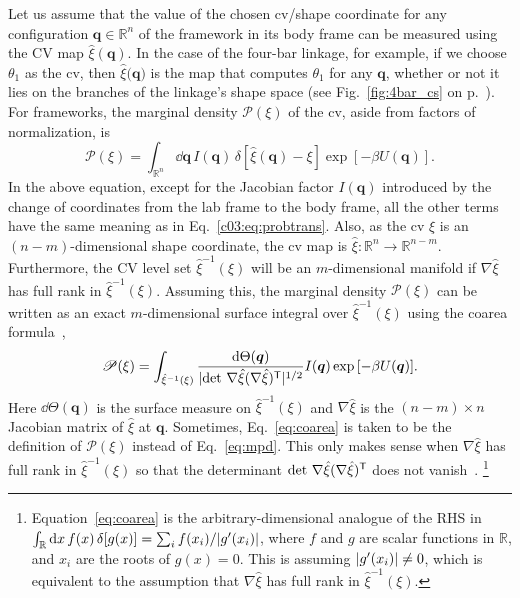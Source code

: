 Let us assume that the value of the chosen \ac{cv}/shape coordinate for any configuration $\bm{q} \in \mathbb{R}^{n}$ of the framework in its body frame can be measured using the CV map $\hat{\xi}(\bm{q})$.
In the case of the four-bar linkage, for example, if we choose $\theta_{1}$ as the \ac{cv}, then $\hat{\xi}(\bm{q)}$ is the map that computes $\theta_{1}$ for any $\bm{q}$, whether or not it lies on the branches of the linkage's shape space (see Fig.~\ref{fig:4bar_cs} on p.~\pageref{page:4bar}).
For frameworks, the marginal density $\mathscr{P}(\xi)$ of the \ac{cv}, aside from factors of normalization, is
%
\begin{equation}
  \mathscr{P}(\xi) = \int_{\mathbb{R}^{n}} \dd\bm{q}\, I(\bm{q})\, \delta\left[\hat{\xi}(\bm{q}) - \xi\right] \exp\left[-\beta U(\bm{q})\right].
  \label{eq:mpd}
\end{equation}
%
In the above equation, except for the Jacobian factor $I(\bm{q})$ introduced by the change of coordinates from the lab frame to the body frame, all the other terms have the same meaning as in Eq.~\eqref{c03:eq:probtrans}.
Also, as the \ac{cv} $\xi$ is an $(n-m)$-dimensional shape coordinate, the \ac{cv} map is $\hat{\xi}: \mathbb{R}^{n} \to \mathbb{R}^{n-m}$.
Furthermore, the CV level set $\hat{\xi}^{-1}(\xi)$ will be an $m$-dimensional manifold if $\nabla\hat{\xi}$ has full rank in $\hat{\xi}^{-1}(\xi)$.
Assuming this, the marginal density $\mathscr{P}(\xi)$ can be written as an exact $m$-dimensional surface integral over $\hat{\xi}^{-1}(\xi)$ using the coarea formula~\cite{hartmann2007,lelievre2010,hartmann2011,diaconis2013},
%
\begin{equation}
  \mathscr{P}(\xi) = \int_{\hat{\xi}^{-1}(\xi)} \frac{\mathrm{d}\Theta(\bm{q})}{\lvert\det\,\nabla\hat{\xi}(\nabla\hat{\xi})^\mathsf{T}\rvert^{1/2}} I(\bm{q}) \exp{\left[-\beta U(\bm{q})\right]}.
  \label{eq:coarea}
\end{equation}
%
Here $\dd\Theta(\bm{q})$ is the surface measure on $\hat{\xi}^{-1}(\xi)$ and $\nabla\hat{\xi}$ is the $(n-m)\times n$ Jacobian matrix of $\hat{\xi}$ at $\bm{q}$.
Sometimes, Eq.~\eqref{eq:coarea} is taken to be the definition of $\mathscr{P}(\xi)$ instead of Eq.~\eqref{eq:mpd}.
This only makes sense when $\nabla\hat{\xi}$ has full rank in $\hat{\xi}^{-1}(\xi)$ so that the determinant $\det\,\nabla\hat{\xi}(\nabla\hat{\xi})^\mathsf{T}$ does not vanish~\cite{lelievre2010}.%
\footnote{Equation~\eqref{eq:coarea} is the arbitrary-dimensional analogue of the RHS in $\int_{\mathbb{R}} \mathrm{d}{x}\, f(x)\, \delta[g(x)] = \sum_{i} f(x_{i})/\lvert g'(x_{i})\rvert$, where $f$ and $g$ are scalar functions in $\mathbb{R}$, and $x_{i}$ are the roots of $g(x) = 0$. This is assuming $\lvert g'(x_{i})\rvert \neq 0$, which is equivalent to the assumption that $\nabla\hat{\xi}$ has full rank in $\hat{\xi}^{-1}(\xi)$.}
